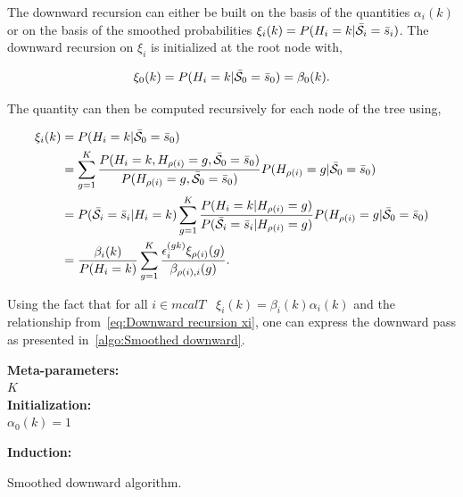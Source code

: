 \documentclass[a4paper,11pt]{report}
\begin{document}
				The downward recursion can either be built on the basis of the quantities $\alpha_{i}(k)$ or on the basis of the smoothed probabilities $\xi_{i}(k) = P(H_{i}=k | \bar{\mathcal{S}}_{i}= \bar{s}_{i})$. The downward recursion on $\xi_{i}$ is initialized at the root node with,
				
				\begin{equation}
				  \xi_{0}(k)= P(H_{i}=k | \bar{\mathcal{S}}_{0}=\bar{s}_{0}) = \beta_{0}(k).
				  \label{eq:Downward init}
				\end{equation}

				The quantity can then be computed recursively for each node of the tree using,
				
				\begin{equation}
					\begin{split}
						\xi_{i}(k)	&= P(H_{i}=k | \bar{\mathcal{S}}_{0}=\bar{s}_{0}) \\
												&= \sum_{g=1}^{K} \frac{P(H_{i}=k, H_{\rho(i)}=g, \bar{\mathcal{S}}_{0}= \bar{s}_{0})}{P(H_{\rho(i)}=g, \bar{\mathcal{S}}_{0}= \bar{s}_{0})} P(H_{\rho(i)}=g | \bar{\mathcal{S}}_{0}= \bar{s}_{0})\\
												&= P(\bar{\mathcal{S}}_{i}= \bar{s}_{i} | H_{i}=k)  
													 \sum_{g=1}^{K} \frac{P(H_{i}=k | H_{\rho(i)}=g)}{P(\bar{\mathcal{S}}_{i}= \bar{s}_{i} | H_{\rho(i)}=g)}
 													 P(H_{\rho(i)}=g | \bar{\mathcal{S}}_{0}= \bar{s}_{0})\\
 												&= \frac{\beta_{i}(k)}{P(H_{i}=k)} \sum_{g=1}^{K} \frac{ \epsilon_{i}^{(gk)} \xi_{\rho(i)}(g)}{\beta_{\rho(i),i}(g)}.
						\end{split}
						\label{eq:Downward recursion xi}
				\end{equation}
				
				Using the fact that for all $i \in mcalT \;\;\; \xi_{i}(k) = \beta_{i}(k)\alpha_{i}(k)$ and the relationship from~\ref{eq:Downward recursion xi}, one can express the downward pass as presented in~\ref{algo:Smoothed downward}.
    
				\begin{center}
					\begin{algorithm}
						\textbf{Meta-parameters:}\\
							$K$\\
								
						\textbf{Initialization:}\\
							$\alpha_{0}(k) = 1$
								
						\textbf{Induction:}\\
						\caption{Smoothed downward algorithm.}
						\label{algo:Smoothed downward}		
					\end{algorithm}        
				\end{center}
				
\end{document}

